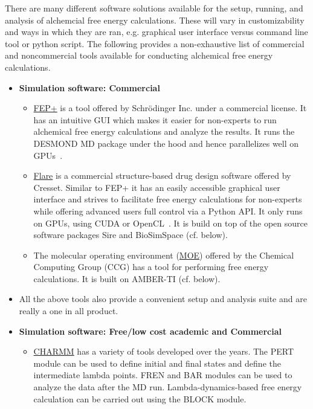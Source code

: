 \documentclass[9pt,bestpractices]{livecoms}
\begin{document}
\label{sec:software}
There are many different software solutions available for the setup, running, and analysis of alchemcial free energy calculations. These will vary in customizability and ways in which they are ran, e.g. graphical user interface versus command line tool or python script. The following provides a non-exhaustive list of commercial and noncommercial tools available for conducting alchemical free energy calculations. 
\begin{itemize}

\item [] \textbf{Simulation software: Commercial}
   \begin{itemize}
    \item \href{https://www.schrodinger.com/fep}{FEP+} is a tool offered by Schr\"{o}dinger Inc. under a commercial license. It has an intuitive GUI which makes it easier for non-experts to run alchemical free energy calculations and analyze the results. It runs the DESMOND MD package under the hood and hence parallelizes well on GPUs~\cite{wang2015accurate}. 
    \item \href{https://www.cresset-group.com/software/flare/}{Flare} is a commercial structure-based drug design software offered by Cresset. Similar to FEP+ it has an easily accessible graphical user interface and strives to facilitate free energy calculations for non-experts while offering advanced users full control via a Python API. It only runs on GPUs, using CUDA or OpenCL~\cite{kuhn2020assessment}. It is build on top of the open source software packages Sire and BioSimSpace (cf. below).
    \item The molecular operating environment (\href{https://www.chemcomp.com/Products.htm}{MOE}) offered by the Chemical Computing Group (CCG) has a tool for performing free energy calculations. It is built on AMBER-TI (cf. below).
    \end{itemize}
    \item[]All the above tools also provide a convenient setup and analysis suite and are really a one in all product. 
\item [] \textbf{Simulation software: Free/low cost academic and Commercial}
	\begin{itemize}
	\item \href{https://www.charmm.org/}{CHARMM} has a variety of tools developed over the years. The PERT module can be used to define initial and final states and define the intermediate lambda points. FREN and BAR modules can be used to analyze the data after the MD run. Lambda-dynamics-based free energy calculation can be carried out using the BLOCK module.  

\end{itemize}
\end{itemize}
\end{document}
